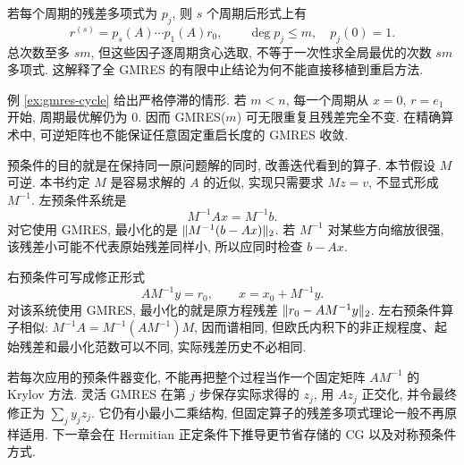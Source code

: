 若每个周期的残差多项式为 $p_j$, 则 $s$ 个周期后形式上有
\[
r^{(s)}=p_s(A)\cdots p_1(A)r_0,\qquad
\deg p_j\le m,\quad p_j(0)=1.
\]
总次数至多 $sm$, 但这些因子逐周期贪心选取, 不等于一次性求全局最优的次数 $sm$ 多项式. 这解释了全 GMRES 的有限中止结论为何不能直接移植到重启方法.

例 \ref{ex:gmres-cycle} 给出严格停滞的情形. 若 $m<n$, 每一个周期从 $x=0$, $r=e_1$ 开始, 周期最优解仍为 $0$. 因而 GMRES($m$) 可无限重复且残差完全不变. 在精确算术中, 可逆矩阵也不能保证任意固定重启长度的 GMRES 收敛.

预条件的目的就是在保持同一原问题解的同时, 改善迭代看到的算子. 本节假设 $M$ 可逆. 本书约定 $M$ 是容易求解的 $A$ 的近似, 实现只需要求 $Mz=v$, 不显式形成 $M^{-1}$. 左预条件系统是
\[
M^{-1}Ax=M^{-1}b.
\]
对它使用 GMRES, 最小化的是 $\lVert M^{-1}(b-Ax)\rVert_2$. 若 $M^{-1}$ 对某些方向缩放很强, 该残差小可能不代表原始残差同样小, 所以应同时检查 $b-Ax$.

右预条件可写成修正形式
\[
AM^{-1}y=r_0,\qquad x=x_0+M^{-1}y.
\]
对该系统使用 GMRES, 最小化的就是原方程残差 $\lVert r_0-AM^{-1}y\rVert_2$. 左右预条件算子相似:
$M^{-1}A=M^{-1}(AM^{-1})M$, 因而谱相同, 但欧氏内积下的非正规程度、起始残差和最小化范数可以不同, 实际残差历史不必相同.

若每次应用的预条件器变化, 不能再把整个过程当作一个固定矩阵 $AM^{-1}$ 的 Krylov 方法. 灵活 GMRES 在第 $j$ 步保存实际求得的 $z_j$, 用 $Az_j$ 正交化, 并令最终修正为 $\sum_j y_jz_j$. 它仍有小最小二乘结构, 但固定算子的残差多项式理论一般不再原样适用. 下一章会在 Hermitian 正定条件下推导更节省存储的 CG 以及对称预条件方式.

